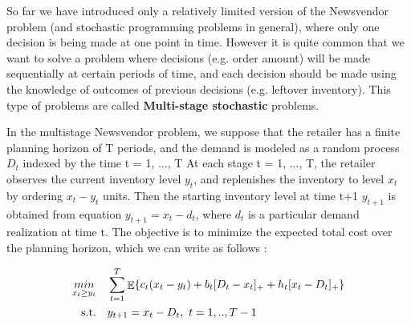 \documentclass[11pt,a4paper]{article}
\DeclareMathOperator{\EX}{\mathbb{E}}
\begin{document}
So far we have introduced only a relatively limited version of the Newsvendor problem (and stochastic programming problems in general), where only one decision is being made at one point in time. However it is quite common that we want to solve a problem where decisions (e.g. order amount) will be made sequentially at certain periods of time, and each decision should be made using the knowledge of outcomes of previous decisions (e.g. leftover inventory). This type of problems are called \textbf{Multi-stage stochastic} problems. 

In the multistage Newsvendor problem, we suppose that the retailer has a finite planning horizon of T periods, and the demand is modeled as a random process $D_t$ indexed by the time t = 1, ..., T \cite{sp_book} At each stage t = 1, ..., T, the retailer observes the current inventory level $y_t$, and replenishes the inventory to level $x_t$ by ordering $x_t-y_t$ units. Then the starting inventory level at time t+1 $y_{t+1}$ is obtained from equation $y_{t+1} = x_t - d_t$, where $d_t$ is a particular demand realization at time t. The objective is to minimize the expected total cost over the planning horizon, which we can write as follows \cite{sp_book}:

\begin{equation}
\begin{aligned}
\underset{x_t \geq y_t}{min} & \quad
\sum\limits_{t=1}^{T}{\EX \{ c_t (x_t - y_t) +b_t\lbrack D_t - x_t\rbrack_+ + h_t \lbrack x_t-D_t \rbrack_+ \}} \nonumber 
\\
\textup{s.t.} & \quad y_{t+1} = x_t - D_t, \ t = 1,..,T-1  \\
\end{aligned}
\end{equation}
\end{document}

